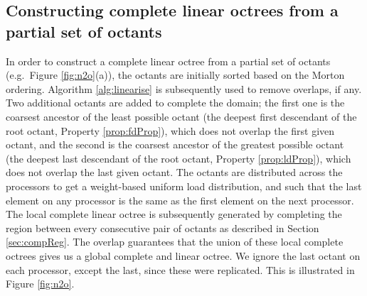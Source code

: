 \subsection{Constructing complete linear octrees from a partial set of octants}
\label{sec:n2o}
In order to construct a complete linear octree from a partial set of
octants (e.g.\ Figure \ref{fig:n2o}(a)), the octants are initially
sorted based on the Morton ordering. Algorithm \ref{alg:linearise} is
subsequently used to remove overlaps, if any. Two additional octants
are added to complete the domain; the first one is the coarsest ancestor
of the least possible octant (the deepest first descendant of the root
octant, Property \ref{prop:fdProp}), which does not overlap the first
given octant, and the second is the coarsest ancestor of the greatest
possible octant (the deepest last descendant of the root octant,
Property \ref{prop:ldProp}), which does not overlap the last given
octant.  The octants are distributed across the processors to get a
weight-based uniform load distribution, and such that the last element
on any processor is the same as the first element on the next
processor. The local complete linear octree is subsequently generated
by completing the region between every consecutive pair of octants as
described in Section \ref{sec:compReg}. The overlap guarantees that
the union of these local complete octrees gives us a global complete
and linear octree. We ignore the last octant on each processor, except
the last, since these were replicated. This is illustrated in Figure
\ref{fig:n2o}.

